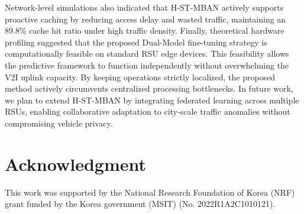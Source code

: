 \documentclass[journal]{IEEEtran}
\begin{document}
Network-level simulations also indicated that H-ST-MBAN actively supports proactive caching by reducing access delay and wasted traffic, maintaining an 89.8\% cache hit ratio under high traffic density.
Finally, theoretical hardware profiling suggested that the proposed Dual-Model fine-tuning strategy is computationally feasible on standard RSU edge devices.
This feasibility allows the predictive framework to function independently without overwhelming the V2I uplink capacity.
By keeping operations strictly localized, the proposed method actively circumvents centralized processing bottlenecks.
In future work, we plan to extend H-ST-MBAN by integrating federated learning across multiple RSUs, enabling collaborative adaptation to city-scale traffic anomalies without compromising vehicle privacy.

\section*{Acknowledgment}
This work was supported by the National Research Foundation of Korea (NRF) grant funded by the Korea government (MSIT) (No. 2022R1A2C1010121).



\end{document}
